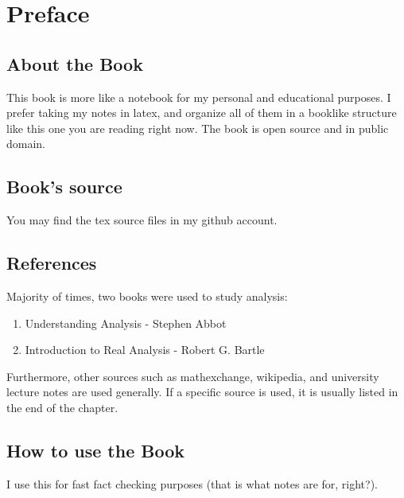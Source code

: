 \chapter*{Preface}
\section*{About the Book}
This book is more like a notebook for my personal and educational purposes. I prefer taking my notes in latex, and organize all of them in a booklike structure like this one you are reading right now. The book is open source and in public domain.
\section*{Book's source}
You may find the tex source files in my github account.
\section*{References}
Majority of times, two books were used to study analysis:
\begin{enumerate}
    \item  Understanding Analysis - Stephen Abbot
    \item  Introduction to Real Analysis - Robert G. Bartle
\end{enumerate}
Furthermore, other sources such as mathexchange, wikipedia, and university lecture notes are used generally. If a specific source is used, it is usually listed in the end of the chapter.
\section*{How to use the Book}
I use this for fast fact checking purposes (that is what notes are for, right?).

